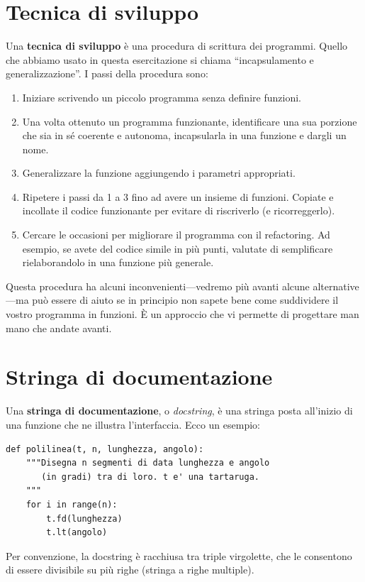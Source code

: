 \documentclass[10pt]{book}
\begin{document}
\section{Tecnica di sviluppo}

Una {\bf tecnica di sviluppo} è una procedura di scrittura dei programmi. Quello che abbiamo usato in questa esercitazione si chiama ``incapsulamento e generalizzazione''. I passi della procedura sono:

\begin{enumerate}

\item Iniziare scrivendo un piccolo programma senza definire funzioni.

\item Una volta ottenuto un programma funzionante, identificare una sua porzione che sia in sé coerente e autonoma, incapsularla in una funzione e dargli un nome.

\item Generalizzare la funzione aggiungendo i parametri appropriati.

\item Ripetere i passi da 1 a 3 fino ad avere un insieme di funzioni. Copiate e incollate il codice funzionante per evitare di riscriverlo (e ricorreggerlo).

\item Cercare le occasioni per migliorare il programma con il refactoring. Ad esempio, se avete del codice simile in più punti, valutate di semplificare rielaborandolo in una funzione più generale.

\end{enumerate}

Questa procedura ha alcuni inconvenienti---vedremo più avanti alcune alternative---ma può essere di aiuto se in principio non sapete bene come suddividere il vostro programma in funzioni. È un approccio che vi permette di progettare man mano che andate avanti.


\section{Stringa di documentazione}
\label{docstring}

Una {\bf stringa di documentazione}, o {\em docstring}, è una stringa posta all'inizio di una funzione che ne illustra l'interfaccia. Ecco un esempio:

\begin{verbatim}
def polilinea(t, n, lunghezza, angolo):
    """Disegna n segmenti di data lunghezza e angolo
       (in gradi) tra di loro. t e' una tartaruga.
    """    
    for i in range(n):
        t.fd(lunghezza)
        t.lt(angolo)
\end{verbatim}
%
Per convenzione, la docstring è racchiusa tra triple virgolette, che le consentono di essere divisibile su più righe (stringa a righe multiple).
\end{document}
